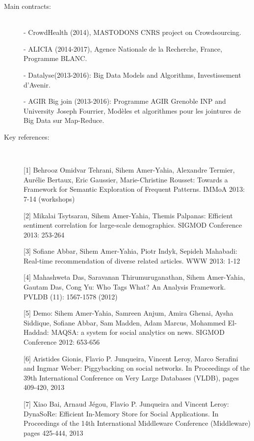 \begin{description}

\item[Main contracts:]  \ \\
- CrowdHealth (2014), MASTODONS CNRS project on Crowdsourcing. 

- ALICIA (2014-2017), Agence Nationale de la Recherche, France, Programme BLANC. 

- Datalyse(2013-2016): Big Data Models and Algorithms, Investissement d'Avenir.


- AGIR Big join (2013-2016): Programme AGIR Grenoble INP and  University Joseph Fourrier,  Mod{\`e}les et algorithmes pour les jointures de Big Data sur Map-Reduce. 
  
\item[Key references:]~%

[1]   Behrooz Omidvar Tehrani, Sihem Amer-Yahia, Alexandre Termier, Aur{\'e}lie Bertaux, Eric Gaussier, Marie-Christine Rousset: Towards a Framework for Semantic Exploration of Frequent Patterns. IMMoA 2013: 7-14 (workshops) 

[2]  Mikalai Tsytsarau, Sihem Amer-Yahia, Themis Palpanas: Efficient sentiment correlation for large-scale demographics. SIGMOD Conference 2013: 253-264

[3]  Sofiane Abbar, Sihem Amer-Yahia, Piotr Indyk, Sepideh Mahabadi: Real-time recommendation of diverse related articles. WWW 2013: 1-12

[4]  Mahashweta Das, Saravanan Thirumuruganathan, Sihem Amer-Yahia, Gautam Das, Cong Yu: Who Tags What? An Analysis Framework. PVLDB (11): 1567-1578 (2012)

[5]  Demo: Sihem Amer-Yahia, Samreen Anjum, Amira Ghenai, Aysha Siddique, Sofiane Abbar, Sam Madden, Adam Marcus, Mohammed El-Haddad: MAQSA: a system for social analytics on news. SIGMOD Conference 2012: 653-656

[6] Aristides Gionis, Flavio P. Junqueira, Vincent Leroy, Marco Serafini and Ingmar Weber: Piggybacking on social networks. In Proceedings of the 39th International Conference on Very Large Databases (VLDB), pages 409-420, 2013

[7]  Xiao Bai, Arnaud J{\'e}gou, Flavio P. Junqueira and Vincent Leroy:  DynaSoRe: Efficient In-Memory Store for Social Applications. In Proceedings of the 14th International Middleware Conference (Middleware)  pages 425-444, 2013

\end{description}

